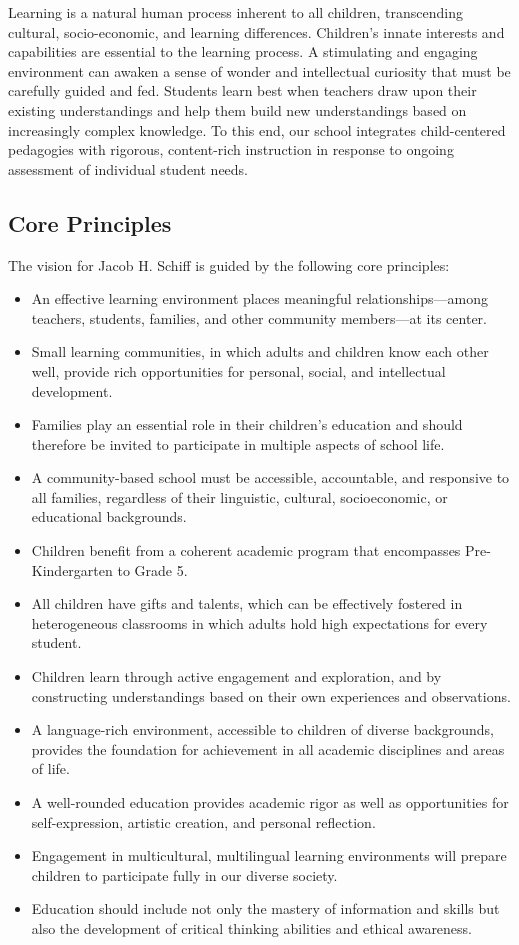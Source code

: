 \documentclass[letterpaper, 11pt]{article}
\begin{document}
Learning is a natural human process inherent to all children, transcending cultural, socio-economic, and learning differences. Children’s innate interests and capabilities are essential to the learning process. A stimulating and engaging environment can awaken a sense of wonder and intellectual curiosity that must be carefully guided and fed. Students learn best when teachers draw upon their existing understandings and help them build new understandings based on increasingly complex knowledge. To this end, our school integrates child-centered pedagogies with rigorous, content-rich instruction in response to ongoing assessment of individual student needs.

\subsection{Core Principles}
\label{sec:org541d0ed}
The vision for Jacob H. Schiff is guided by the following core principles:
\begin{itemize}
\item An effective learning environment places meaningful relationships—among teachers, students, families, and other community members—at its center.
\item Small learning communities, in which adults and children know each other well, provide rich opportunities for personal, social, and intellectual development.
\item Families play an essential role in their children’s education and should therefore be invited to participate in multiple aspects of school life.
\item A community-based school must be accessible, accountable, and responsive to all families, regardless of their linguistic, cultural, socioeconomic, or educational backgrounds.
\item Children benefit from a coherent academic program that encompasses Pre-Kindergarten to Grade 5.
\item All children have gifts and talents, which can be effectively fostered in heterogeneous classrooms in which adults hold high expectations for every student.
\item Children learn through active engagement and exploration, and by constructing understandings based on their own experiences and observations.
\item A language-rich environment, accessible to children of diverse backgrounds, provides the foundation for achievement in all academic disciplines and areas of life.
\item A well-rounded education provides academic rigor as well as opportunities for self-expression, artistic creation, and personal reflection.
\item Engagement in multicultural, multilingual learning environments will prepare children to participate fully in our diverse society.
\item Education should include not only the mastery of information and skills but also the development of critical thinking abilities and ethical awareness.
\end{itemize}
\end{document}
